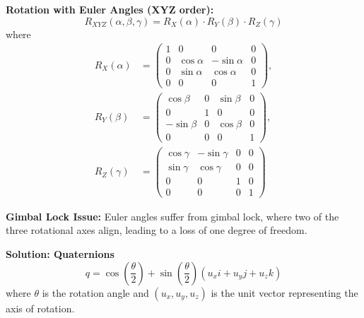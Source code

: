 \textbf{Rotation with Euler Angles (XYZ order):}
\begin{equation}
    R_{XYZ}(\alpha, \beta, \gamma) = R_X(\alpha) \cdot R_Y(\beta) \cdot R_Z(\gamma)
\end{equation}
where
\begin{align}
    R_X(\alpha) &= \begin{pmatrix}
    1 & 0 & 0 & 0 \\
    0 & \cos\alpha & -\sin\alpha & 0 \\
    0 & \sin\alpha & \cos\alpha & 0 \\
    0 & 0 & 0 & 1
    \end{pmatrix}, \\
    R_Y(\beta) &= \begin{pmatrix}
    \cos\beta & 0 & \sin\beta & 0 \\
    0 & 1 & 0 & 0 \\
    -\sin\beta & 0 & \cos\beta & 0 \\
    0 & 0 & 0 & 1
    \end{pmatrix}, \\
    R_Z(\gamma) &= \begin{pmatrix}
    \cos\gamma & -\sin\gamma & 0 & 0 \\
    \sin\gamma & \cos\gamma & 0 & 0 \\
    0 & 0 & 1 & 0 \\
    0 & 0 & 0 & 1
    \end{pmatrix}
\end{align}

\textbf{Gimbal Lock Issue:} Euler angles suffer from gimbal lock, where two of the three rotational axes align, leading to a loss of one degree of freedom.

\textbf{Solution: Quaternions}
\begin{equation}
    q = \cos\left(\frac{\theta}{2}\right) + \sin\left(\frac{\theta}{2}\right)(u_x i + u_y j + u_z k)
\end{equation}
where \( \theta \) is the rotation angle and \( (u_x, u_y, u_z) \) is the unit vector representing the axis of rotation.






